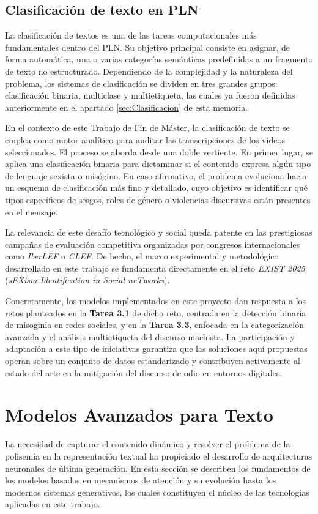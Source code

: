 \subsection{Clasificación de texto en PLN}
\label{subsec:ClasificacionPLN}
La clasificación de textos es una de las tareas computacionales más fundamentales dentro del PLN. Su objetivo principal consiste en asignar, de forma automática, una o varias categorías semánticas predefinidas a un fragmento de texto no estructurado. Dependiendo de la complejidad y la naturaleza del problema, los sistemas de clasificación se dividen en tres grandes grupos: clasificación binaria, multiclase y multietiqueta, las cuales ya fueron definidas anteriormente en el apartado \ref{sec:Clasificacion} de esta memoria.

En el contexto de este Trabajo de Fin de Máster, la clasificación de texto se emplea como motor analítico para auditar las transcripciones de los videos seleccionados. El proceso se aborda desde una doble vertiente. En primer lugar, se aplica una clasificación binaria para dictaminar si el contenido expresa algún tipo de lenguaje sexista o misógino. En caso afirmativo, el problema evoluciona hacia un esquema de clasificación más fino y detallado, cuyo objetivo es identificar qué tipos específicos de sesgos, roles de género o violencias discursivas están presentes en el mensaje. 

La relevancia de este desafío tecnológico y social queda patente en las prestigiosas campañas de evaluación competitiva organizadas por congresos internacionales como \textit{IberLEF} o \textit{CLEF}. De hecho, el marco experimental y metodológico desarrollado en este trabajo se fundamenta directamente en el reto \textit{EXIST 2025} (\textit{sEXism Identification in Social neTworks}). 

Concretamente, los modelos implementados en este proyecto dan respuesta a los retos planteados en la \textbf{Tarea 3.1} de dicho reto, centrada en la detección binaria de misoginia en redes sociales, y en la \textbf{Tarea 3.3}, enfocada en la categorización avanzada y el análisis multietiqueta del discurso machista. La participación y adaptación a este tipo de iniciativas garantiza que las soluciones aquí propuestas operan sobre un conjunto de datos estandarizado y contribuyen activamente al estado del arte en la mitigación del discurso de odio en entornos digitales. 

\section{Modelos Avanzados para Texto}
\label{sec:ModelosTexto}
La necesidad de capturar el contenido dinámico y resolver el problema de la polisemia en la representación textual ha propiciado el desarrollo de arquitecturas neuronales de última generación. En esta sección se describen los fundamentos de los modelos basados en mecanismos de atención y su evolución hasta los modernos sistemas generativos, los cuales constituyen el núcleo de las tecnologías aplicadas en este trabajo. 


